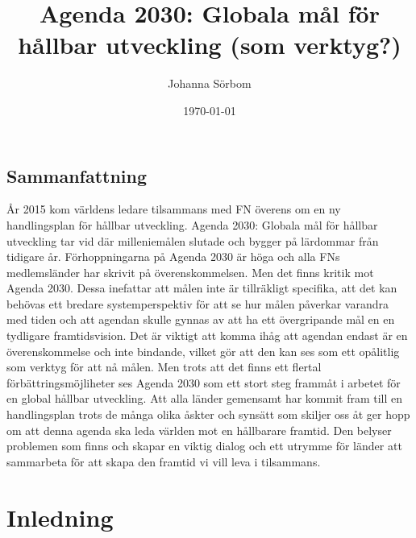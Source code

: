 \documentclass{report}
\title{Agenda 2030: Globala mål för hållbar utveckling (som verktyg?)}
\date{\today}
\author{Johanna Sörbom}
\begin{document}
\maketitle

\newpage
\begin{titlepage}
\section*{Sammanfattning}
År 2015 kom världens ledare tilsammans med FN överens om en ny handlingsplan för hållbar utveckling. Agenda 2030: Globala mål för hållbar utveckling tar vid där milleniemålen slutade och bygger på lärdommar från tidigare år. Förhoppningarna på Agenda 2030 är höga och alla FNs medlemsländer har skrivit på överenskommelsen. Men det finns kritik mot Agenda 2030. Dessa inefattar att målen inte är tillräkligt specifika, att det kan behövas ett bredare systemperspektiv för att se hur målen påverkar varandra med tiden och att agendan skulle gynnas av att ha ett övergripande mål en en tydligare framtidsvision. Det är viktigt att komma ihåg att agendan endast är en överenskommelse och inte bindande, vilket gör att den kan ses som ett opålitlig som verktyg för att nå målen. Men trots att det finns ett flertal förbättringsmöjliheter ses Agenda 2030 som ett stort steg frammåt i arbetet för en global hållbar utveckling. Att alla länder gemensamt har kommit fram till en handlingsplan trots de många olika åskter och synsätt som skiljer oss åt ger hopp om att denna agenda ska leda världen mot en hållbarare framtid. Den belyser problemen som finns och skapar en viktig dialog och ett utrymme för länder att sammarbeta för att skapa den framtid vi vill leva i tilsammans. 

\newpage
\tableofcontents
\end{titlepage}
\newpage
{}
\section{Inledning}
\end{document}
